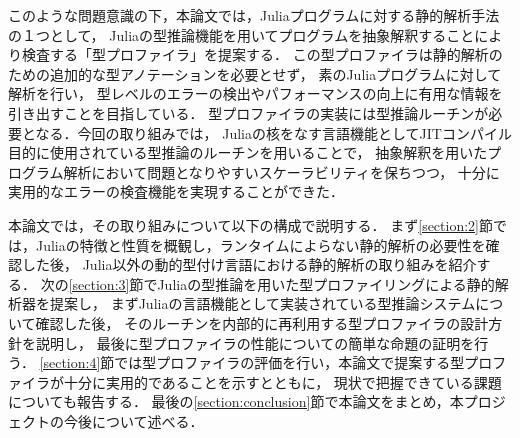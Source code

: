 このような問題意識の下，本論文では，Juliaプログラムに対する静的解析手法の１つとして，
Juliaの型推論機能を用いてプログラムを抽象解釈することにより検査する「型プロファイラ」を提案する．
この型プロファイラは静的解析のための追加的な型アノテーションを必要とせず，
素のJuliaプログラムに対して解析を行い，
型レベルのエラーの検出やパフォーマンスの向上に有用な情報を引き出すことを目指している．
型プロファイラの実装には型推論ルーチンが必要となる．今回の取り組みでは，
Juliaの核をなす言語機能としてJITコンパイル目的に使用されている型推論のルーチンを用いることで，
抽象解釈を用いたプログラム解析において問題となりやすいスケーラビリティを保ちつつ，
十分に実用的なエラーの検査機能を実現することができた．

本論文では，その取り組みについて以下の構成で説明する．
まず\ref{section:2}節では，Juliaの特徴と性質を概観し，ランタイムによらない静的解析の必要性を確認した後，
Julia以外の動的型付け言語における静的解析の取り組みを紹介する．
次の\ref{section:3}節でJuliaの型推論を用いた型プロファイリングによる静的解析器を提案し，
まずJuliaの言語機能として実装されている型推論システムについて確認した後，
そのルーチンを内部的に再利用する型プロファイラの設計方針を説明し，
最後に型プロファイラの性能についての簡単な命題の証明を行う． %
\ref{section:4}節では型プロファイラの評価を行い，本論文で提案する型プロファイラが十分に実用的であることを示すとともに，
現状で把握できている課題についても報告する．
最後の\ref{section:conclusion}節で本論文をまとめ，本プロジェクトの今後について述べる．
